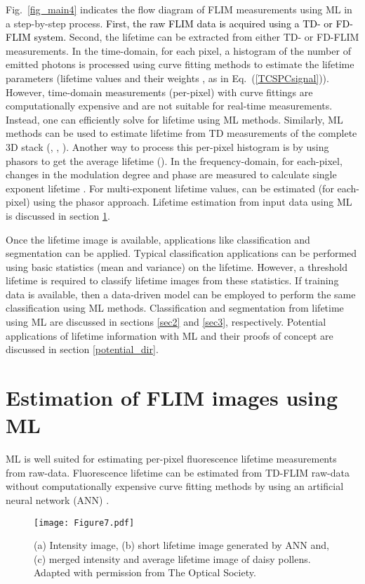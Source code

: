 \documentclass[12pt]{iopart}
\newcommand{\cc}[1]{\textcolor{black}{#1}}
\begin{document}
Fig.~\ref{fig_main4} indicates the flow diagram of FLIM measurements using ML in a step-by-step process. \cc{First, the raw FLIM data is acquired using a TD- or FD-FLIM system.} Second, the lifetime can be extracted from either TD- or FD-FLIM measurements. In the time-domain, for each pixel, a histogram of the number of emitted photons is processed using curve fitting methods to estimate the lifetime parameters (lifetime values  and their weights , as in Eq.~(\ref{TCSPCsignal})). However, time-domain measurements (per-pixel) with curve fittings are computationally expensive and are not suitable for real-time measurements. Instead, one can efficiently solve for lifetime using ML methods. Similarly, ML methods can be used to estimate lifetime from TD measurements of the complete 3D stack (, , ). Another way to process this per-pixel histogram is by using phasors to get the average lifetime (). In the frequency-domain, for each-pixel, changes in the modulation degree  and phase  are measured to calculate single exponent lifetime . For multi-exponent lifetime values,  can be estimated (for each-pixel) using the phasor approach. Lifetime estimation from input data using ML is discussed in section \ref{sec1}. 

Once the lifetime image is available, applications like classification and segmentation can be applied. Typical classification applications can be performed using basic statistics (mean and variance) on the lifetime. However, a threshold lifetime is required to classify lifetime images from these statistics. If training data is available, then a data-driven model can be employed to perform the same classification using ML methods. Classification and segmentation from lifetime using ML are discussed in sections \ref{sec2} and \ref{sec3}, respectively. Potential applications of lifetime information with ML and their proofs of concept are discussed in section \ref{potential_dir}.

\section{Estimation of FLIM images using ML}\label{sec1}
ML is well suited for estimating per-pixel fluorescence lifetime measurements from raw-data. Fluorescence lifetime can be estimated from TD-FLIM raw-data without computationally expensive curve fitting methods by using an artificial neural network (ANN) \cite{ann}.

\begin{figure}[!t]
\centering
\texttt{[image: Figure7.pdf]}
\caption{(a) Intensity image, (b) short lifetime  image generated by ANN and, (c) merged intensity and average lifetime  image of daisy pollens. Adapted with permission from \cite{ann}  The Optical Society.}\label{fig1_ann}
\end{figure}
 
\end{document}
